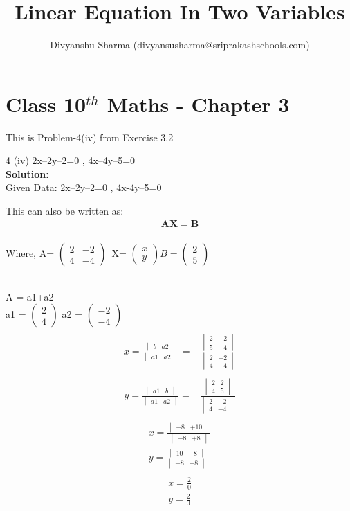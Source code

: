 \documentclass[12pt]{article}
\title{Linear Equation In Two Variables}
\author{Divyanshu Sharma (divyansusharma@sriprakashschools.com)}
\newcommand{\myvec}[1]{\ensuremath{\begin{pmatrix}#1\end{pmatrix}}}
\newcommand{\mydet}[1]{\ensuremath{\begin{vmatrix}#1\end{vmatrix}}}
\newcommand{\solution}{\noindent \textbf{Solution: }}
\let\vec\mathbf
\begin{document}
\maketitle
\section*{Class 10$^{th}$ Maths - Chapter 3}
This is Problem-4(iv) from Exercise 3.2
\item 4 (iv) 2x–2y–2=0 , 4x–4y–5=0 \\

\solution \\
Given Data: 2x–2y–2=0 , 4x-4y–5=0

This can also be written as:
\begin{align}
\vec{AX}=\vec{B}
\end{align}
 \\ Where, A= $\myvec{2&-2\\4&-4}$\ X= $\myvec{x\\y} B= $\myvec{2\\5}

    \\A = a1+a2
    \\a1 = \myvec{2\\4} a2 = \myvec{-2\\-4}
\begin{align}
\\x = \frac{\mydet{ b & a2}}{\mydet{ a1 & a2}} =&
\frac{\mydet{ 2 & -2 \\ 5 & -4}}{\mydet{2&-2\\4&-4}}
\end{align}
\begin{align}
\\y = \frac{\mydet{ a1 & b}}{\mydet{ a1 & a2}} =&
\frac{\mydet{ 2 & 2 \\ 4 & 5}}{\mydet{2&-2\\4&-4}}
\end{align}
\begin{align}
  \\x = \frac{\mydet{ -8 & +10}}{\mydet{ -8& +8}} 
  \\y =   \frac{\mydet{ 10 & -8}}{\mydet{ -8 & +8}} 
\end{align}
\begin{align}
\\ x = \frac{2}{0}
\\ y = \frac{2}{0}
\end{align}
\end{document}
